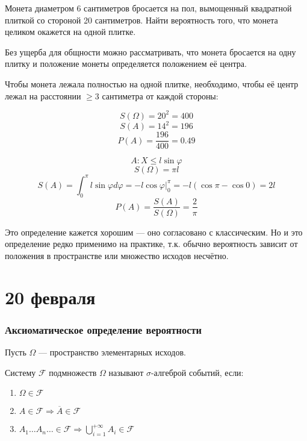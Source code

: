 \documentclass[12pt, a4paper, oneside]{book}
\begin{document}
\begin{example}
    Монета диаметром 6 сантиметров бросается на пол, вымощенный квадратной плиткой со стороной 20 сантиметров. Найти вероятность того, что монета целиком окажется на одной плитке.

    Без ущерба для общности можно рассматривать, что монета бросается на одну плитку и положение монеты определяется положением её центра.

    Чтобы монета лежала полностью на одной плитке, необходимо, чтобы её центр лежал на расстоянии \( \geq 3\) сантиметра от каждой стороны:

    \begin{figure}[h]
        \centering
        
    \end{figure}

    \[S(\Omega) = 20^2 = 400\]
    \[S(A) = 14^2 = 196\]
    \[P(A) = \frac{196}{400} = 0.49\]
\end{example}

\begin{example}
    \? %

    \[A : X \leq l \sin \varphi\]
    \[S(\Omega) = \pi l\]
    \[S(A) = \int_0^\pi l \sin \varphi d\varphi = - l \cos \varphi \Big|_0^\pi = - l(\cos \pi - \cos 0) = 2l\]
    \[P(A) = \frac{S(A)}{S(\Omega)} = \frac{2}{\pi}\]
\end{example}

Это определение кажется хорошим --- оно согласовано с классическим. Но и это определение редко применимо на практике, т.к. обычно вероятность зависит от положения в пространстве или множество исходов несчётно.

\chapter{20 февраля}

\subsection{Аксиоматическое определение вероятности}

Пусть \(\Omega\) --- пространство элементарных исходов.

\begin{definition}
    Систему \(\mathcal{F}\) подмножеств \(\Omega\) называют \(\sigma\)-алгеброй событий, если:
    \begin{enumerate}
        \item \(\Omega\in\mathcal{F}\)
        \item \(A\in \mathcal{F} \Rightarrow \overline A \in \mathcal{F}\)
        \item \(A_1 \dots A_n \dots \in \mathcal{F} \Rightarrow \bigcup\limits_{i = 1}^{+\infty} A_i \in \mathcal{F}\)
    \end{enumerate}
\end{definition}
\end{document}
